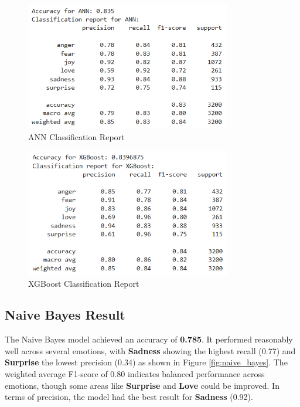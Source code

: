 \begin{figure}[h!]
\centering
\includegraphics[width=0.8\textwidth]{ann_result.png}
\caption{ANN Classification Report}
\label{fig:ann}
\end{figure}

\begin{figure}[h!]
\centering
\includegraphics[width=0.8\textwidth]{xgboost_result.png}
\caption{XGBoost Classification Report}
\label{fig:xgboost}
\end{figure}

\clearpage

\subsection{Naive Bayes Result}
The Naive Bayes model achieved an accuracy of \textbf{0.785}. It performed reasonably well across several emotions, with \textbf{Sadness} showing the highest recall (0.77) and \textbf{Surprise} the lowest precision (0.34) as shown in Figure \ref{fig:naive_bayes}. The weighted average F1-score of 0.80 indicates balanced performance across emotions, though some areas like \textbf{Surprise} and \textbf{Love} could be improved. In terms of precision, the model had the best result for \textbf{Sadness} (0.92).

